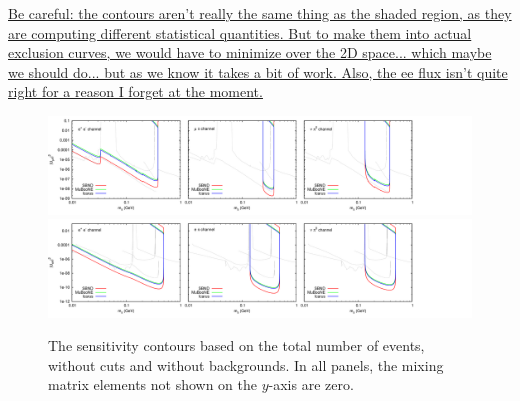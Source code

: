 \documentclass[11pt, a4paper]{article}
\newcommand{\newtext}[2]{\textcolor{#1}{\ul{#2}}}
\begin{document}
\newtext{PB}{Be careful: the contours aren't really the same thing as the
shaded region, as they are computing different statistical quantities. But to
make them into actual exclusion curves, we would have to minimize over the 2D
space... which maybe we should do... but as we know it takes a bit of work.
Also, the ee flux isn't quite right for a reason I forget at the moment.}


\begin{figure}[t]
\center
\includegraphics[width=1.0\textwidth,clip,trim=0 20 300 15]{figures/zerobg_um4_all_panels.pdf}
\includegraphics[width=1.0\textwidth,clip,trim=0 20 300 15]{figures/zerobg_ue4_all_panels.pdf}

\caption{\label{fig:no_cuts_no_bkg}The sensitivity contours based on the total number of events, without cuts and without backgrounds. In all panels, the mixing matrix elements not shown on the $y$-axis are zero.}

\end{figure}
\end{document}

